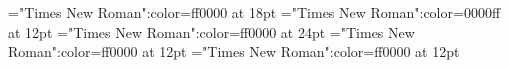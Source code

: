 \documentclass[a4paper]{article}
\begin{document}
 
\pagestyle{plain} 
\font\spanheaderdiv="Times New Roman":color=ff0000 at 18pt
\font\spandiv="Times New Roman":color=0000ff at 12pt
\font\divheaderdiv="Times New Roman":color=ff0000 at 24pt
\font\divdiv="Times New Roman":color=ff0000 at 12pt
\font\div="Times New Roman":color=ff0000 at 12pt
\pagestyle{fancy} 



\end{document}
